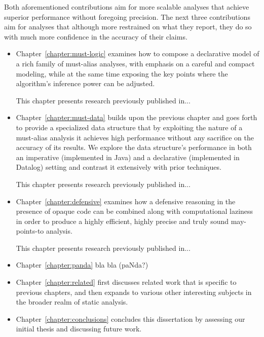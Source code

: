 Both aforementioned contributions aim for more scalable analyses that achieve superior performance without foregoing precision. The next three contributions aim for analyses that although more restrained on what they report, they do so with much more confidence in the accuracy of their claims.

\begin{itemize}[$\bullet$]
\item Chapter~\ref{chapter:must-logic} examines how to compose a declarative model of a rich family of must-alias analyses, with emphasis on a careful and compact modeling, while at the same time exposing the key points where the algorithm's inference power can be adjusted.

This chapter presents research previously published in...

\item Chapter~\ref{chapter:must-data} builds upon the previous chapter and goes forth to provide a specialized data structure that by exploiting the nature of a must-alias analysis it achieves high performance without any sacrifice on the accuracy of its results. We explore the data structure's performance in both an imperative (implemented in Java) and a declarative (implemented in Datalog) setting and contrast it extensively with prior techniques.

This chapter presents research previously published in...

\item Chapter~\ref{chapter:defensive} examines how a defensive reasoning in the presence of opaque code can be combined along with computational laziness in order to produce a highly efficient, highly precise and truly sound may-points-to analysis.

This chapter presents research previously published in...
\end{itemize}

\begin{itemize}[$\bullet$]
\item Chapter~\ref{chapter:panda} bla bla (paNda?)

\item Chapter~\ref{chapter:related} first discusses related work that is specific to previous chapters, and then expands to various other interesting subjects in the broader realm of static analysis.

\item Chapter~\ref{chapter:conclusions} concludes this dissertation by assessing our initial thesis and discussing future work.
\end{itemize}